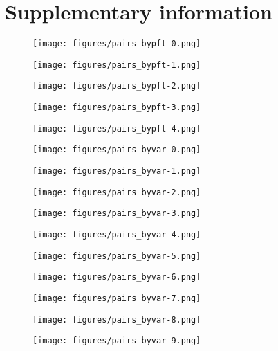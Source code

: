 \section{Supplementary information}

\begin{figure}
  \centering
  \texttt{[image: figures/pairs\_bypft-0.png]}
\end{figure}

\begin{figure}
  \centering
  \texttt{[image: figures/pairs\_bypft-1.png]}
\end{figure}

\begin{figure}
  \centering
  \texttt{[image: figures/pairs\_bypft-2.png]}
\end{figure}

\begin{figure}
  \centering
  \texttt{[image: figures/pairs\_bypft-3.png]}
\end{figure}

\begin{figure}
  \centering
  \texttt{[image: figures/pairs\_bypft-4.png]}
\end{figure}

\begin{figure}
  \centering
  \texttt{[image: figures/pairs\_byvar-0.png]}
\end{figure}
\begin{figure}
  \centering
  \texttt{[image: figures/pairs\_byvar-1.png]}
\end{figure}
\begin{figure}
  \centering
  \texttt{[image: figures/pairs\_byvar-2.png]}
\end{figure}
\begin{figure}
  \centering
  \texttt{[image: figures/pairs\_byvar-3.png]}
\end{figure}
\begin{figure}
  \centering
  \texttt{[image: figures/pairs\_byvar-4.png]}
\end{figure}
\begin{figure}
  \centering
  \texttt{[image: figures/pairs\_byvar-5.png]}
\end{figure}
\begin{figure}
  \centering
  \texttt{[image: figures/pairs\_byvar-6.png]}
\end{figure}
\begin{figure}
  \centering
  \texttt{[image: figures/pairs\_byvar-7.png]}
\end{figure}
\begin{figure}
  \centering
  \texttt{[image: figures/pairs\_byvar-8.png]}
\end{figure}
\begin{figure}
  \centering
  \texttt{[image: figures/pairs\_byvar-9.png]}
\end{figure}

